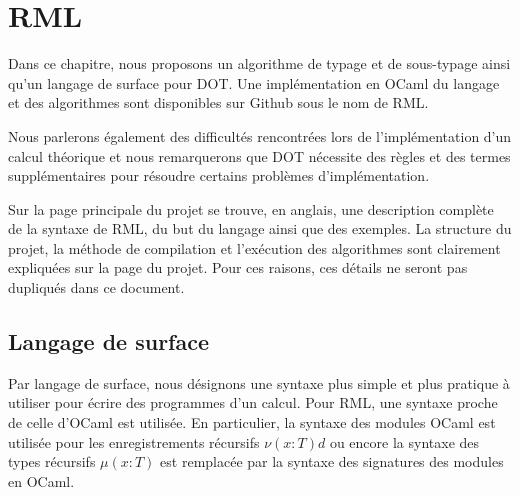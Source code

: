 \chapter{RML}
\label{chapter:rml}
\renewcommand\listingscaption{Code RML}


Dans ce chapitre, nous proposons un algorithme de typage et de sous-typage ainsi
qu'un langage de surface pour DOT. Une implémentation en OCaml du langage et des
algorithmes sont disponibles sur Github\cite{rml-github} sous le nom de RML.

Nous parlerons également des difficultés rencontrées lors de l'implémentation
d'un calcul théorique et nous remarquerons que DOT nécessite des règles et des termes
supplémentaires pour résoudre certains problèmes d'implémentation.


Sur la page principale du projet se trouve, en anglais, une description complète de la syntaxe de RML,
du but du langage ainsi que des exemples.
La structure du projet, la méthode de compilation et l'exécution des
algorithmes sont clairement expliquées sur la page du projet. Pour ces raisons,
ces détails ne seront pas dupliqués dans ce document.

\section{Langage de surface}

Par langage de surface, nous désignons une syntaxe plus simple et plus pratique
à utiliser pour écrire des programmes d'un calcul. Pour RML, une syntaxe proche
de celle d'OCaml est utilisée. En particulier, la syntaxe des modules OCaml est utilisée pour les
enregistrements récursifs $\nu(x : T)d$ ou encore la syntaxe des types récursifs $\mu(x :
T)$ est remplacée par la syntaxe des signatures des modules en OCaml.

